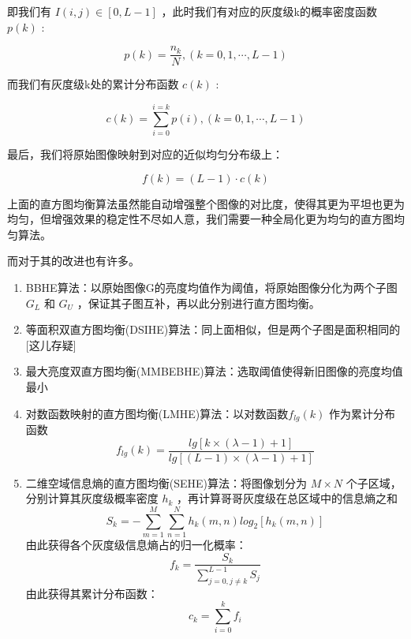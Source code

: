 即我们有 $ I(i,j) \in [0,L-1] $ ，此时我们有对应的灰度级k的概率密度函数 $ p(k) $ :

\begin{equation}
	p(k) = \frac{n_k}{N},(k=0,1,\cdots,L-1)
\end{equation}

而我们有灰度级k处的累计分布函数 $ c(k) $ :

\begin{equation}
	c(k) = \sum_{i=0}^{i=k} p(i), (k = 0,1,\cdots,L-1)
\end{equation}

最后，我们将原始图像映射到对应的近似均匀分布级上：

\begin{equation}
	f(k) = (L-1) \cdot c(k)
\end{equation}

上面的直方图均衡算法虽然能自动增强整个图像的对比度，使得其更为平坦也更为均匀，但增强效果的稳定性不尽如人意，我们需要一种全局化更为均匀的直方图均匀算法。

而对于其的改进也有许多。

\begin{enumerate}
	\item BBHE算法：以原始图像G的亮度均值作为阈值，将原始图像分化为两个子图 $ G_L $ 和 $ G_U $ ，保证其子图互补，再以此分别进行直方图均衡。
	\item 等面积双直方图均衡(DSIHE)算法：同上面相似，但是两个子图是面积相同的[这儿存疑]
	\item 最大亮度双直方图均衡(MMBEBHE)算法：选取阈值使得新旧图像的亮度均值最小
	\item 对数函数映射的直方图均衡(LMHE)算法：以对数函数$ f_{lg}(k) $ 作为累计分布函数
	\begin{equation}
		f_{lg}(k) = \frac{lg[k \times (\lambda - 1) + 1]}{lg[(L-1) \times (\lambda-1) +1 ]}
	\end{equation}
	\item 二维空域信息熵的直方图均衡(SEHE)算法：将图像划分为 $ M \times N $ 个子区域，分别计算其灰度级概率密度 $ h_k $ ，再计算哥哥灰度级在总区域中的信息熵之和
	\begin{equation}
		S_k = -\sum^{M}_{m=1} \sum^{N}_{n=1} h_k(m,n)log_2[h_k(m,n)]
	\end{equation}
	由此获得各个灰度级信息熵占的归一化概率：
	\begin{equation}
		f_k = \frac{S_k}{\sum^{L-1}_{j=0,j \neq k} S_j}
	\end{equation}
	由此获得其累计分布函数：
	\begin{equation}
		c_k = \sum^{k}_{i=0}f_i
	\end{equation}
\end{enumerate}

